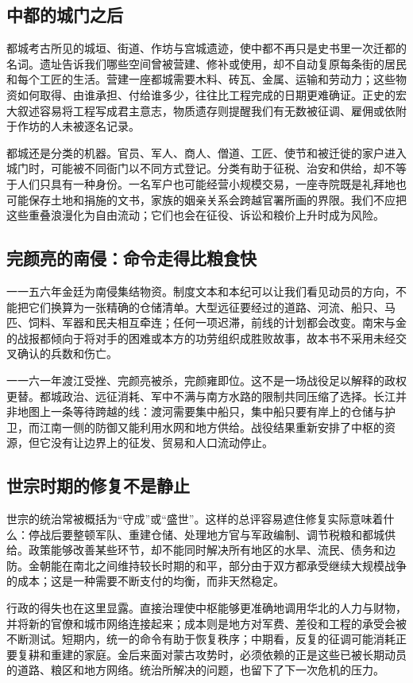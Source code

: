 \subsection{中都的城门之后}

都城考古所见的城垣、街道、作坊与宫城遗迹，使中都不再只是史书里一次迁都的名词。遗址告诉我们哪些空间曾被营建、修补或使用，却不自动复原每条街的居民和每个工匠的生活。营建一座都城需要木料、砖瓦、金属、运输和劳动力；这些物资如何取得、由谁承担、付给谁多少，往往比工程完成的日期更难确证。正史的宏大叙述容易将工程写成君主意志，物质遗存则提醒我们有无数被征调、雇佣或依附于作坊的人未被逐名记录。

都城还是分类的机器。官员、军人、商人、僧道、工匠、使节和被迁徙的家户进入城门时，可能被不同衙门以不同方式登记。分类有助于征税、治安和供给，却不等于人们只具有一种身份。一名军户也可能经营小规模交易，一座寺院既是礼拜地也可能保存土地和捐施的文书，家族的姻亲关系会跨越官署所画的界限。我们不应把这些重叠浪漫化为自由流动；它们也会在征役、诉讼和粮价上升时成为风险。

\subsection{完颜亮的南侵：命令走得比粮食快}

一一五六年金廷为南侵集结物资。制度文本和本纪可以让我们看见动员的方向，不能把它们换算为一张精确的仓储清单。大型远征要经过的道路、河流、船只、马匹、饲料、军器和民夫相互牵连；任何一项迟滞，前线的计划都会改变。南宋与金的战报都倾向于将对手的困难或本方的功劳组织成胜败故事，故本书不采用未经交叉确认的兵数和伤亡。

一一六一年渡江受挫、完颜亮被杀，完颜雍即位。这不是一场战役足以解释的政权更替。都城政治、远征消耗、军中不满与南方水路的限制共同压缩了选择。长江并非地图上一条等待跨越的线：渡河需要集中船只，集中船只要有岸上的仓储与护卫，而江南一侧的防御又能利用水网和地方供给。战役结果重新安排了中枢的资源，但它没有让边界上的征发、贸易和人口流动停止。

\subsection{世宗时期的修复不是静止}

世宗的统治常被概括为“守成”或“盛世”。这样的总评容易遮住修复实际意味着什么：停战后要整顿军队、重建仓储、处理地方官与军政编制、调节税粮和都城供给。政策能够改善某些环节，却不能同时解决所有地区的水旱、流民、债务和边防。金朝能在南北之间维持较长时期的和平，部分由于双方都承受继续大规模战争的成本；这是一种需要不断支付的均衡，而非天然稳定。

行政的得失也在这里显露。直接治理使中枢能够更准确地调用华北的人力与财物，并将新的官僚和城市网络连接起来；成本则是地方对军费、差役和工程的承受会被不断测试。短期内，统一的命令有助于恢复秩序；中期看，反复的征调可能消耗正要复耕和重建的家庭。金后来面对蒙古攻势时，必须依赖的正是这些已被长期动员的道路、粮区和地方网络。统治所解决的问题，也留下了下一次危机的压力。
